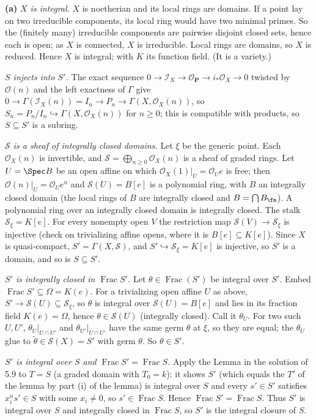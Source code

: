 \documentclass[11pt]{article}
\begin{document}
\textbf{(a)} \emph{$X$ is integral.} $X$ is noetherian and its local rings are domains. If a point lay on two irreducible components, its local ring would have two minimal primes. So the (finitely many) irreducible components are pairwise disjoint closed sets, hence each is open; as $X$ is connected, $X$ is irreducible. Local rings are domains, so $X$ is reduced. Hence $X$ is integral; with $K$ its function field. (It is a variety.)

\emph{$S$ injects into $S'$.} The exact sequence $0\to\mathcal I_X\to\mathcal O_{\mathbf P}\to i_*\mathcal O_X\to0$ twisted by $\mathcal O(n)$ and the left exactness of $\Gamma$ give $0\to\Gamma(\mathcal I_X(n))=I_n\to P_n\to\Gamma(X,\mathcal O_X(n))$, so $S_n=P_n/I_n\hookrightarrow\Gamma(X,\mathcal O_X(n))$ for $n\ge0$; this is compatible with products, so $S\subseteq S'$ is a subring.

\emph{$\mathcal S$ is a sheaf of integrally closed domains.} Let $\xi$ be the generic point. Each $\mathcal O_X(n)$ is invertible, and $\mathcal S=\bigoplus_{n\ge0}\mathcal O_X(n)$ is a sheaf of graded rings. Let $U=\Spec B$ be an open affine on which $\mathcal O_X(1)|_U=\mathcal O_Ue$ is free; then $\mathcal O(n)|_U=\mathcal O_Ue^n$ and $\mathcal S(U)=B[e]$ is a polynomial ring, with $B$ an integrally closed domain (the local rings of $B$ are integrally closed and $B=\bigcap B_\fm$). A polynomial ring over an integrally closed domain is integrally closed. The stalk $\mathcal S_\xi=K[e]$. For every nonempty open $V$ the restriction map $\mathcal S(V)\to\mathcal S_\xi$ is injective (check on trivializing affine opens, where it is $B[e]\subseteq K[e]$). Since $X$ is quasi-compact, $S'=\Gamma(X,\mathcal S)$, and $S'\hookrightarrow\mathcal S_\xi=K[e]$ is injective, so $S'$ is a domain, and so is $S\subseteq S'$.

\emph{$S'$ is integrally closed in $\operatorname{Frac}S'$.} Let $\theta\in\operatorname{Frac}(S')$ be integral over $S'$. Embed $\operatorname{Frac}S'\subseteq\Omega=K(e)$. For a trivializing open affine $U$ as above, $S'\to\mathcal S(U)\subseteq\mathcal S_\xi$, so $\theta$ is integral over $\mathcal S(U)=B[e]$ and lies in its fraction field $K(e)=\Omega$, hence $\theta\in\mathcal S(U)$ (integrally closed). Call it $\theta_U$. For two such $U,U'$, $\theta_U|_{U\cap U'}$ and $\theta_{U'}|_{U\cap U'}$ have the same germ $\theta$ at $\xi$, so they are equal; the $\theta_U$ glue to $\tilde\theta\in\mathcal S(X)=S'$ with germ $\theta$. So $\theta\in S'$.

\emph{$S'$ is integral over $S$ and $\operatorname{Frac}S'=\operatorname{Frac}S$.} Apply the Lemma in the solution of 5.9 to $T=S$ (a graded domain with $T_0=k$): it shows $S'$ (which equals the $T'$ of the lemma by part (i) of the lemma) is integral over $S$ and every $s'\in S'$ satisfies $x_i^ns'\in S$ with some $x_i\ne0$, so $s'\in\operatorname{Frac}S$. Hence $\operatorname{Frac}S'=\operatorname{Frac}S$. Thus $S'$ is integral over $S$ and integrally closed in $\operatorname{Frac}S$, so $S'$ is the integral closure of $S$.
\end{document}
